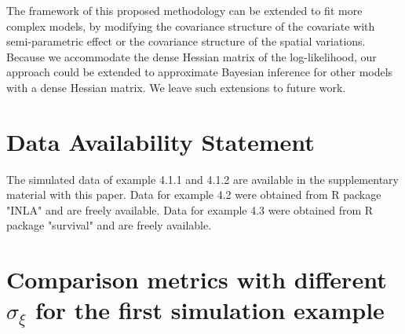 \documentclass[ba]{imsart}
\begin{document}
The framework of this proposed methodology can be extended to fit more complex models, by modifying the covariance structure of the covariate with semi-parametric effect or the covariance structure of the spatial variations. Because we accommodate the dense Hessian matrix of the log-likelihood, our approach could be extended to approximate Bayesian inference for other models with a dense Hessian matrix. We leave such extensions to future work.

\section*{Data Availability Statement}
The simulated data of example 4.1.1 and 4.1.2 are available in the supplementary material with this paper. Data for example 4.2 were obtained from R package "INLA" \citep{inla} and are freely available.
Data for example 4.3 were obtained from R package "survival" \citep{survival-package} and are freely available. 


\appendix

\section{Comparison metrics with different $\sigma_\xi$ for the first simulation example}

\begin{table}[h]
  \begin{center}
  \end{center}
  \caption{Comparison metrics in terms of MSE and posterior coverage rate from 500 independent replications when $\sigma_\xi = 1.3$, for the 60 frailty effects and the fixed effect in the first simulation study in section \ref{subsubsec:sim1}.}
  \label{table:Sim1Agg1}
  \end{table}
\end{document}
